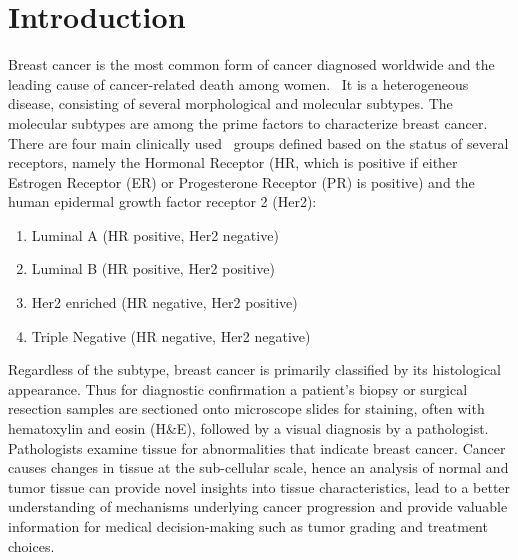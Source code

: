 
\chapter{Introduction}\label{chapter:introduction}
Breast cancer is the most common form of cancer diagnosed worldwide
and the leading cause of cancer-related death among women.~\cite{chhikara2022global}
It is a heterogeneous disease, consisting of several morphological and molecular subtypes.
The molecular subtypes are among the prime factors to characterize breast cancer.
There are four main clinically used~\cite{home} groups defined based on the status of several receptors,
namely the Hormonal Receptor (HR, which is positive if either Estrogen Receptor (ER)
or Progesterone Receptor (PR) is positive) and the human epidermal
growth factor receptor 2 (Her2):
\begin{enumerate}
    \itemsep0em 
    \item Luminal A (HR positive, Her2 negative)
    \item Luminal B (HR positive, Her2 positive)
    \item Her2 enriched (HR negative, Her2 positive) 
    \item Triple Negative (HR negative, Her2 negative)
\end{enumerate}
Regardless of the subtype, breast cancer is primarily classified by its histological appearance. 
Thus for diagnostic confirmation a patient’s biopsy or surgical resection samples
are sectioned onto microscope slides for staining, often with hematoxylin and eosin
(H\&E), followed by a visual diagnosis by a pathologist. Pathologists examine
tissue for abnormalities that indicate breast cancer. 
Cancer causes changes in tissue at the sub-cellular scale, hence an analysis of normal
and tumor tissue can provide novel insights into
tissue characteristics, lead to a better understanding of mechanisms
underlying cancer progression and provide valuable information for medical
decision-making such as tumor grading and treatment choices.~\cite{vu2019methods}

